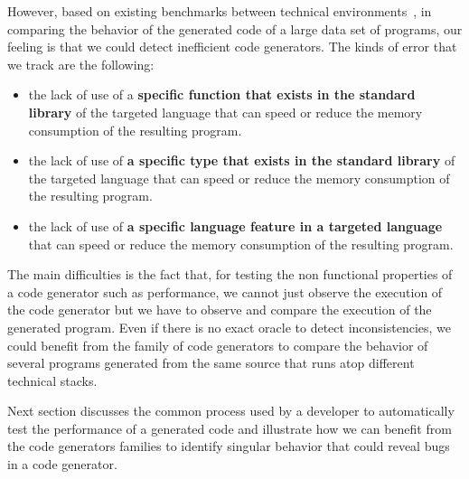 However, based on existing benchmarks between technical environments~\cite{hundt2011loop}, in comparing the behavior of the generated code of a large data set of programs, our feeling is that we could detect inefficient code generators. The kinds of error that we track are the following:
\begin{itemize}
	\item  the lack of use of a \textbf{specific function that exists in the standard library} of the targeted language  that can speed or reduce the memory consumption of the resulting program.
	\item the lack of use of \textbf{a specific type that exists in the standard library} of the targeted language  that can speed or reduce the memory consumption of the resulting program.
	\item  the lack of use of\textbf{ a specific language feature in a targeted language}  that can speed or reduce the memory consumption of the resulting program. 
\end{itemize}

The main difficulties is the fact that, for testing the non functional properties of a code generator such as performance, we cannot just observe the execution of the code generator but we have to observe and compare the execution of the generated program. Even if there is no exact oracle to detect inconsistencies, we could benefit from the family of code generators to compare the behavior of several programs generated from the same source that runs atop different technical stacks. 

Next section discusses the common process used by a developer to automatically test the performance of a generated code and illustrate how we can benefit from the code generators families to identify singular behavior that could reveal bugs in a code generator. 





 



